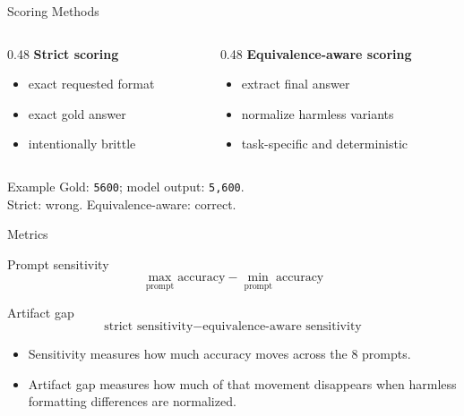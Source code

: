 \documentclass[aspectratio=169,11pt]{beamer}
\newcommand{\smallgap}{\vspace{0.35em}}
\begin{document}
\begin{frame}{Scoring Methods}
  \begin{columns}[T]
    \begin{column}{0.48\linewidth}
      \textbf{Strict scoring}
      \smallgap
      \begin{itemize}
        \item exact requested format
        \item exact gold answer
        \item intentionally brittle
      \end{itemize}
    \end{column}
    \begin{column}{0.48\linewidth}
      \textbf{Equivalence-aware scoring}
      \smallgap
      \begin{itemize}
        \item extract final answer
        \item normalize harmless variants
        \item task-specific and deterministic
      \end{itemize}
    \end{column}
  \end{columns}

  \vspace{1em}
  \begin{block}{Example}
    Gold: \texttt{5600}; model output: \texttt{5,600}.\\
    Strict: wrong. Equivalence-aware: correct.
  \end{block}
\end{frame}

\begin{frame}{Metrics}
  \begin{block}{Prompt sensitivity}
    \[
      \max_{\text{prompt}} \text{accuracy} - \min_{\text{prompt}} \text{accuracy}
    \]
  \end{block}

  \begin{block}{Artifact gap}
    \[
      \text{strict sensitivity} - \text{equivalence-aware sensitivity}
    \]
  \end{block}

  \begin{itemize}
    \item Sensitivity measures how much accuracy moves across the 8 prompts.
    \item Artifact gap measures how much of that movement disappears when harmless formatting differences are normalized.
  \end{itemize}
\end{frame}
\end{document}
